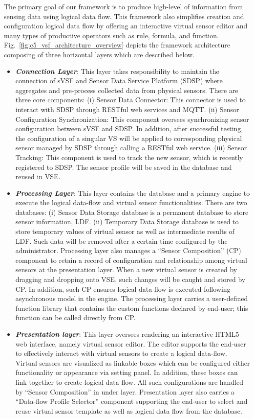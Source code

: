 The primary goal of our framework is to produce high-level of information from sensing data using logical data flow. This framework also simplifies creation and configuration logical data flow by offering an interactive virtual sensor editor and many types of productive operators such as rule, formula, and function. Fig.~\ref{fig:c5_vsf_architecture_overview} depicts the framework architecture composing of three horizontal layers which are described below.
\begin{itemize}
    \item \textbf{\textit{Connection Layer}}: This layer takes responsibility to maintain the connection of sVSF and Sensor Data Service Platform (SDSP) where aggregates and pre-process collected data from physical sensors. There are three core components: (i) Sensor Data Connector: This connector is used to interact with SDSP through RESTful web services and MQTT. (ii) Sensor Configuration Synchronization: This component oversees synchronizing sensor configuration between sVSF and SDSP. In addition, after successful testing, the configuration of a singular VS will be applied to corresponding physical sensor managed by SDSP through calling a RESTful web service. (iii) Sensor Tracking: This component is used to track the new sensor, which is recently registered to SDSP. The sensor profile will be saved in the database and reused in VSE.
    \item \textbf{\textit{Processing Layer}}: This layer contains the database and a primary engine to execute the logical data-flow and virtual sensor functionalities. There are two databases: (i) Sensor Data Storage database is a permanent database to store sensor information, LDF. (ii) Temporary Data Storage database is used to store temporary values of virtual sensor as well as intermediate results of LDF. Such data will be removed after a certain time configured by the administrator. Processing layer also manages a “Sensor Composition” (CP) component to retain a record of configuration and relationship among virtual sensors at the presentation layer. When a new virtual sensor is created by dragging and dropping onto VSE, such changes will be caught and stored by CP. In addition, such CP ensures logical data-flow is executed following asynchronous model in the engine. The processing layer carries a user-defined function library that contains the custom functions declared by end-user; this function can be called directly from CP.
    \item \textbf{\textit{Presentation layer}}: This layer oversees rendering an interactive HTML5 web interface, namely virtual sensor editor. The editor supports the end-user to effectively interact with virtual sensors to create a logical data-flow. Virtual sensors are visualized as linkable boxes which can be configured either functionality or appearance via setting panel. In addition, these boxes can link together to create logical data flow.  All such configurations are handled by “Sensor Composition” in under layer. Presentation layer also carries a “Data-flow Profile Selector” component supporting the end-user to select and reuse virtual sensor template as well as logical data flow from the database.

\end{itemize}
